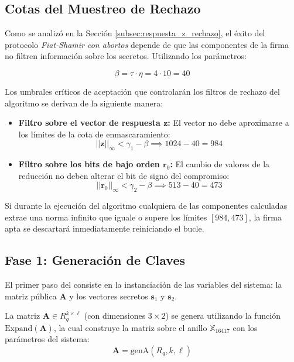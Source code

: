 \documentclass[11pt, a4paper]{report}
\theoremstyle{definition}
\begin{document}
\subsection{Cotas del Muestreo de Rechazo}

Como se analizó en la Sección \ref{subsec:respuesta_z_rechazo}, el éxito del protocolo \textit{Fiat-Shamir con abortos}\cite{lyubashevsky2009fiat} depende de que las componentes de la firma no filtren información sobre los secretos. Utilizando los parámetros:

\begin{equation}
    \beta = \tau \cdot \eta = 4 \cdot 10 = 40
\end{equation}

Los umbrales críticos de aceptación que controlarán los filtros de rechazo del algoritmo se derivan de la siguiente manera:

\begin{itemize}
    \item \textbf{Filtro sobre el vector de respuesta $\mathbf{z}$:} El vector no debe aproximarse a los límites de la cota de enmascaramiento:
    \begin{equation}
        ||\mathbf{z}||_\infty < \gamma_1 - \beta \implies 1024 - 40 = 984
    \end{equation}
    
    \item \textbf{Filtro sobre los bits de bajo orden $\mathbf{r}_0$:} El cambio de valores de la reducción no deben alterar el bit de signo del compromiso:
    \begin{equation}
        ||\mathbf{r}_0||_\infty < \gamma_2 - \beta \implies 513 - 40 = 473
    \end{equation}
\end{itemize}

Si durante la ejecución del algoritmo cualquiera de las componentes calculadas extrae una norma infinito que iguale o supere los límites $[984, 473]$, la firma apta se descartará inmediatamente reiniciando el bucle.

\subsection{Fase 1: Generación de Claves}

El primer paso del consiste en la instanciación de las variables del sistema: la matriz pública $\mathbf{A}$ y los vectores secretos $\mathbf{s}_1$ y $\mathbf{s}_2$.

La matriz $\mathbf{A} \in R_q^{k \times \ell}$ (con dimensiones $3 \times 2$) se genera utilizando la función $\text{Expand}(\mathbf{A})$, la cual construye la matriz sobre el anillo $\mathbb{X}_{16417}$ con los parámetros del sistema:
\begin{equation}
    \mathbf{A} = \text{genA}(R_q, k, \ell)
\end{equation}
\end{document}
